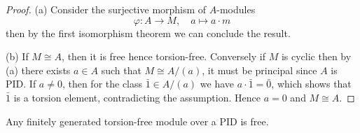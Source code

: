 \documentclass[12pt,a4paper]{article}
\begin{document}
\begin{proof}
    (a) Consider the surjective morphism of \(A\)-modules
    \[\varphi: A \to M, \quad a \mapsto a \cdot m\]
    then by the first isomorphism theorem we can conclude the result.

    (b) If \(M \cong A\), then it is free hence torsion-free. Conversely if \(M\) is cyclic then by (a) there exists \(a \in A\) such that \(M \cong A/(a)\), it must be principal since \(A\) is PID. If \(a \neq 0\), then for the class \(\bar{1} \in A/(a)\) we have \(a \cdot \bar{1} = \bar{0}\), which shows that \(\bar{1}\) is a torsion element, contradicting the assumption. Hence \(a = 0\) and \(M \cong A\).
\end{proof}

\begin{theorem}
    Any finitely generated torsion-free module over a PID is free.
\end{theorem}
\end{document}
